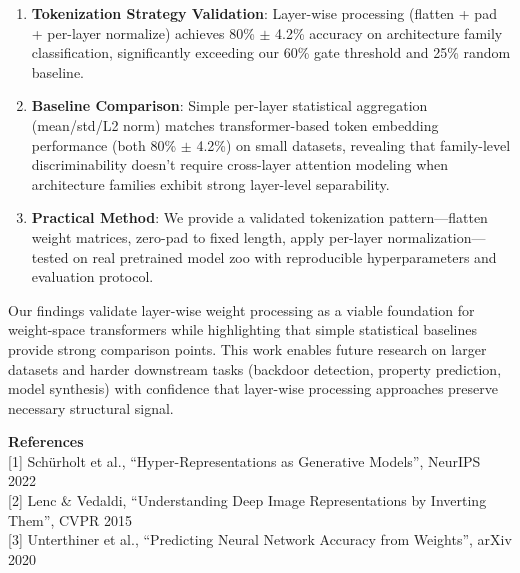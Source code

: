 \begin{enumerate}
\item \textbf{Tokenization Strategy Validation}: Layer-wise processing (flatten + pad + per-layer normalize) achieves 80\% $\pm$ 4.2\% accuracy on architecture family classification, significantly exceeding our 60\% gate threshold and 25\% random baseline.

\item \textbf{Baseline Comparison}: Simple per-layer statistical aggregation (mean/std/L2 norm) matches transformer-based token embedding performance (both 80\% $\pm$ 4.2\%) on small datasets, revealing that family-level discriminability doesn't require cross-layer attention modeling when architecture families exhibit strong layer-level separability.

\item \textbf{Practical Method}: We provide a validated tokenization pattern---flatten weight matrices, zero-pad to fixed length, apply per-layer normalization---tested on real pretrained model zoo with reproducible hyperparameters and evaluation protocol.
\end{enumerate}

Our findings validate layer-wise weight processing as a viable foundation for weight-space transformers while highlighting that simple statistical baselines provide strong comparison points. This work enables future research on larger datasets and harder downstream tasks (backdoor detection, property prediction, model synthesis) with confidence that layer-wise processing approaches preserve necessary structural signal.

\textbf{References}\\
{[}1{]} Schürholt et al., ``Hyper-Representations as Generative Models'', NeurIPS 2022\\
{[}2{]} Lenc \& Vedaldi, ``Understanding Deep Image Representations by Inverting Them'', CVPR 2015\\
{[}3{]} Unterthiner et al., ``Predicting Neural Network Accuracy from Weights'', arXiv 2020
